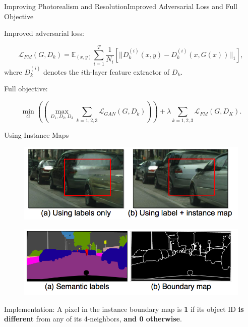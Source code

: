 \documentclass{beamer}
\begin{document}
\begin{frame}{Improving Photorealism and Resolution}{Improved Adversarial Loss and Full Objective}
%
%
\begin{beamerboxesrounded}[upper=uppercol,lower=lowercol,shadow=false]{	Improved adversarial loss:}

\begin{equation}
\mathcal{L}_{FM}(G,D_k)=\mathbb{E}_{(x,y)} \sum_{i=1}^T \frac{1}{N_i}[||D_k^{(i)}(x,y)-D_{k}^{(i)}(x,G(x))||_1],
\end{equation}
where $D_k^{(i)}$ denotes the $i$th-layer feature extractor of $D_k$.
\end{beamerboxesrounded}
%
%
\begin{beamerboxesrounded}[upper=uppercol,lower=lowercol,shadow=false]{	Full objective: }

\begin{equation}
\min_G ((\max_{D_1,D_2,D_3}\sum_{k=1,2,3} \mathcal{L}_{GAN}(G,D_k)))+\lambda \sum_{k=1,2,3}\mathcal{L}_{FM}(G,D_K).
\end{equation}
\end{beamerboxesrounded}


\end{frame}

\begin{frame}{Using Instance Maps}
	\begin{figure}
		\centering
		\includegraphics[height=0.3\textheight]{images/instance_result}
	\end{figure}
\begin{figure}
	\centering
	\includegraphics[height=0.3\textheight]{images/instance_maps}
\end{figure}
%
%
\begin{beamerboxesrounded}[upper=uppercol,lower=lowercol,shadow=false]{Implementation:}
A pixel in the instance boundary map is \textbf{1} if its object ID \textbf{is different} from any of its 4-neighbors, \textbf{and 0 otherwise}.
\end{beamerboxesrounded}
\end{frame}
\end{document}
